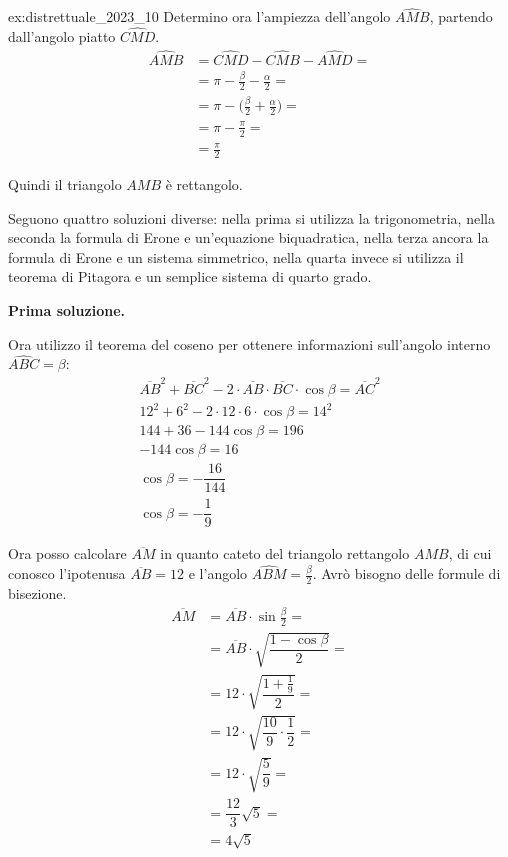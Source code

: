\begin{soluzione}{ex:distrettuale_2023_10}
    Determino ora l'ampiezza dell'angolo $\hat{AMB}$, partendo dall'angolo piatto $\hat{CMD}$.
    \begin{align*}
        \hat{AMB} &= \hat{CMD} - \hat{CMB} - \hat{AMD} = \\
        &= \pi - \frac{\beta}{2} - \frac{\alpha}{2} = \\
        &= \pi - \biggl(\frac{\beta}{2} + \frac{\alpha}{2} \biggr) = \\
        &= \pi - \frac{\pi}{2} = \\
        &= \frac{\pi}{2}
    \end{align*}

    Quindi il triangolo $AMB$ è rettangolo.

    Seguono quattro soluzioni diverse:
    nella prima si utilizza la trigonometria, nella seconda la formula di Erone e un'equazione biquadratica,
    nella terza ancora la formula di Erone e un sistema simmetrico,
    nella quarta invece si utilizza il teorema di Pitagora e un semplice sistema di quarto grado.

    \bigskip
    \textbf{Prima soluzione.}

    Ora utilizzo il teorema del coseno per ottenere informazioni sull'angolo interno $\hat{ABC} = \beta$:
    \begin{gather*}
        \overline{AB}^2 + \overline{BC}^2 - 2 \cdot \overline{AB} \cdot \overline{BC} \cdot \cos \beta = \overline{AC}^2 \\
        12^2 + 6^2 - 2 \cdot 12 \cdot 6 \cdot \cos \beta = 14^2 \\
        144 + 36 - 144 \cos \beta = 196 \\
        -144 \cos \beta = 16 \\
        \cos \beta = -\dfrac{16}{144} \\
        \cos \beta = -\dfrac{1}{9}
    \end{gather*}

    Ora posso calcolare $\overline{AM}$ in quanto cateto del triangolo rettangolo $AMB$, di cui conosco l'ipotenusa
    $\overline{AB} = 12$ e l'angolo $\hat{ABM} = \frac{\beta}{2}$.
    Avrò bisogno delle formule di bisezione.
    \begin{align*}
        \overline{AM} &= \overline{AB} \cdot \sin \frac{\beta}{2} = \\
        &= \overline{AB} \cdot \sqrt {\dfrac{1 - \cos \beta}{2}} = \\
        &= 12 \cdot \sqrt {\dfrac{1 + \frac{1}{9}}{2}} = \\
        &= 12 \cdot \sqrt {\dfrac{10}{9} \cdot \dfrac{1}{2}} = \\
        &= 12 \cdot \sqrt {\dfrac{5}{9}} = \\
        &= \dfrac{12}{3} \sqrt {5} = \\
        &= 4 \sqrt {5}
    \end{align*}


\end{soluzione}
